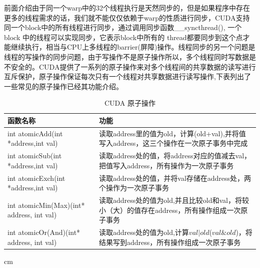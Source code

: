 前面介绍由于同一个warp中的32个线程执行是天然同步的，但是如果程序中存在更多的线程需求的话，我们就不能仅仅依赖于warp的性质进行同步，CUDA支持同一个block中的所有线程进行同步，通过调用同步函数\_\_syncthread(), 一个block 中的线程可以实现同步，它表示block中所有的 thread都要同步到这个点才能继续执行，相当与CPU上多线程的barrier(屏障)操作。线程同步的另一个问题是线程的写操作的同步问题，由于写操作不是原子操作所以，多个线程同时写数据是不安全的。CUDA提供了一系列的原子操作来对多个线程间的共享数据的读写进行互斥保护，原子操作保证每次只有一个线程对共享数据进行读写操作,下表列出了一些常见的原子操作已经其功能介绍。
\begin{table}[t]
\newcommand{\tabincell}[2]{\begin{tabular}{@{}#1@{}}#2\end{tabular}}
\setlength{\abovecaptionskip}{0.2cm}
\scriptsize{
\renewcommand{\tabcolsep}{0.09cm}
\renewcommand{\arraystretch}{0.8}
\centering
\begin{tabular}{|p{6cm}<{\centering}|p{6cm}<{\centering}|}
\hline 函数名称& 功能\\ \hline
int atomicAdd(int *address,int val)&读取address里的值为old，计算(old+val),并将值写入address，这三个操作在一次原子事务中完成\\ \hline
int atomicSub(int *address,int val)&读取address处的值，将address对应的值减去val，把值写入address，所有操作为一次原子事务\\ \hline
int atomicExch(int *address,int val)&读取address处的值，并将val存储在address处，两个操作为一次原子事务\\ \hline
int atomicMin(Max)(int* address, int val)&读取address处的值为old,并且比较old和val，将较小（大）的值存在address，所有操作组成一次原子事务\\ \hline
int atomicOr(And)(int* address, int val)&读取address处的值为old,计算$val|old$($val \& old$)，将结果写到address，所有操作组成一次原子事务\\ \hline
\end{tabular}
  cm
  \caption{CUDA 原子操作}
  \label{CY}
}
\end{table}

